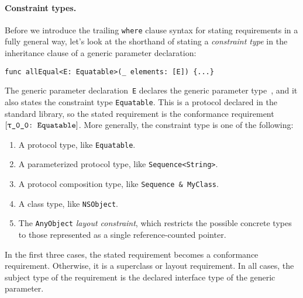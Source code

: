 \documentclass[../generics]{subfiles}
\begin{document}
\paragraph{Constraint types.}
Before we introduce the trailing \texttt{where} clause syntax for stating requirements in a fully general way, let's look at the shorthand of stating a \emph{constraint type} in the inheritance clause of a generic parameter declaration:
\begin{Verbatim}
func allEqual<E: Equatable>(_ elements: [E]) {...}
\end{Verbatim}
The generic parameter declaration~\texttt{E} declares the generic parameter type~\rT, and it also states the constraint type \texttt{Equatable}. This is a protocol declared in the standard library, so the stated requirement is the conformance requirement $\ConfReq{\rT}{Equatable}$. More generally, the constraint type is one of the following:
\begin{enumerate}
\item A protocol type, like \texttt{Equatable}.
\item A parameterized protocol type, like \texttt{Sequence<String>}.
\item A protocol composition type, like \texttt{Sequence \& MyClass}.
\item A class type, like \texttt{NSObject}.
\item The \texttt{AnyObject} \emph{layout constraint}, which restricts the possible concrete types to those represented as a single reference-counted pointer.
\end{enumerate}
In the first three cases, the stated requirement becomes a conformance requirement. Otherwise, it is a superclass or layout requirement. In all cases, the subject type of the requirement is the declared interface type of the generic parameter.
\end{document}
